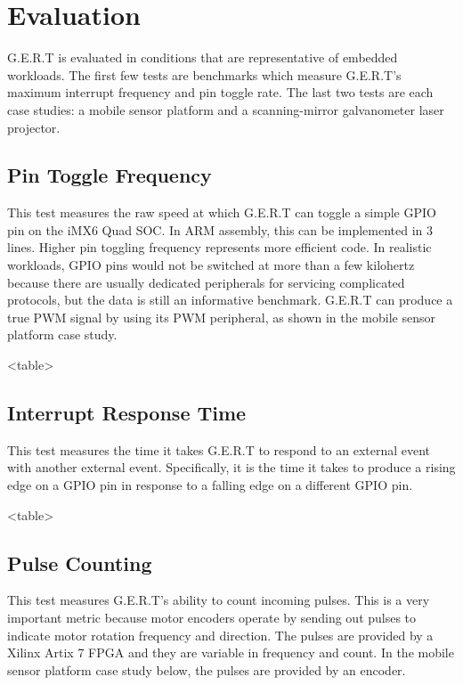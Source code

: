\chapter{Evaluation}

G.E.R.T is evaluated in conditions that are representative of embedded workloads.
The first few tests are benchmarks which measure G.E.R.T's maximum interrupt
frequency and pin toggle rate. The last two tests are each case studies: a mobile
sensor platform and a scanning-mirror galvanometer laser projector.

\section{Pin Toggle Frequency}
This test measures the raw speed at which G.E.R.T can toggle a simple GPIO pin on
the iMX6 Quad SOC. In ARM assembly, this can be implemented in 3 lines. Higher pin
toggling frequency represents more efficient code. In realistic workloads, GPIO pins
would not be switched at more than a few kilohertz because there are usually dedicated
peripherals for servicing complicated protocols, but the data is still an informative
benchmark. G.E.R.T can produce a true PWM signal by using its PWM peripheral, as shown
in the mobile sensor platform case study.

<table>


\section{Interrupt Response Time}
This test measures the time it takes G.E.R.T to respond to an external event
with another external event. Specifically, it is the time it takes to produce
a rising edge on a GPIO pin in response to a falling edge on a different GPIO pin.

<table>

\section{Pulse Counting}
This test measures G.E.R.T's ability to count incoming pulses. This is a very
important metric because motor encoders operate by sending out pulses to indicate
motor rotation frequency and direction. The pulses are provided by a Xilinx Artix 7
FPGA and they are variable in frequency and count. In the mobile sensor platform
case study below, the pulses are provided by an encoder.


